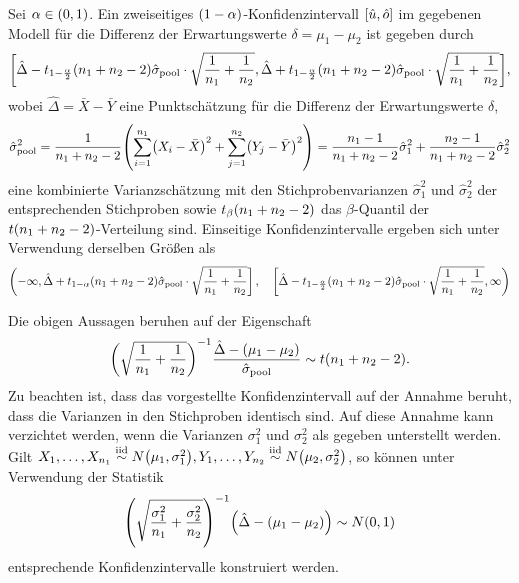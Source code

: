 \documentclass{lecture}
\begin{document}
    \begin{theorem}
        Sei \(\alpha \in \parentheses*{0, 1}\).
        Ein zweiseitiges \(\parentheses*{1 - \alpha}\)-Konfidenzintervall \(\brackets*{\hat{u}, \hat{o}}\) im gegebenen Modell für die Differenz der Erwartungswerte \(\delta = \mu_1 - \mu_2\) ist gegeben durch
        \[
            \brackets*{\hat{\Delta} - t_{1 - \frac{\alpha}{2}}\parentheses*{n_1 + n_2 - 2}\hat{\sigma}_{\text{pool}} \cdot \sqrt{\frac{1}{n_1} + \frac{1}{n_2}}, \hat{\Delta} + t_{1 - \frac{\alpha}{2}}\parentheses*{n_1 + n_2 - 2}\hat{\sigma}_{\text{pool}} \cdot \sqrt{\frac{1}{n_1} + \frac{1}{n_2}}},
        \]
        wobei \(\hat{\Delta} = \bar{X} - \bar{Y}\) eine Punktschätzung für die Differenz der Erwartungswerte \(\delta\),
        \[
            \hat{\sigma}_{\text{pool}}^2 = \frac{1}{n_1 + n_2 - 2}\parentheses*{\sum_{i = 1}^{n_1}\parentheses*{X_i - \bar{X}}^2 + \sum_{j = 1}^{n_2}\parentheses*{Y_j - \bar{Y}}^2} = \frac{n_1 - 1}{n_1 + n_2 - 2}\hat{\sigma}_1^2 + \frac{n_2 - 1}{n_1 + n_2 - 2}\hat{\sigma}_2^2
        \]
        eine kombinierte Varianzschätzung mit den Stichprobenvarianzen \(\hat{\sigma}_1^2\) und \(\hat{\sigma}_2^2\) der entsprechenden Stichproben sowie \(t_\beta\parentheses*{n_1 + n_2 - 2}\) das \(\beta\)-Quantil der \(t\parentheses*{n_1 + n_2 - 2}\)-Verteilung sind.
        Einseitige Konfidenzintervalle ergeben sich unter Verwendung derselben Größen als
        \[
            \left(-\infty, \hat{\Delta} + t_{1 - \alpha}\parentheses*{n_1 + n_2 - 2}\hat{\sigma}_{\text{pool}} \cdot \sqrt{\frac{1}{n_1} + \frac{1}{n_2}}\right], \quad \left[\hat{\Delta} - t_{1 - \frac{\alpha}{2}}\parentheses*{n_1 + n_2 - 2}\hat{\sigma}_{\text{pool}} \cdot \sqrt{\frac{1}{n_1} + \frac{1}{n_2}}, \infty\right)
        \]
    \end{theorem}

    Die obigen Aussagen beruhen auf der Eigenschaft
    \[
        \parentheses*{\sqrt{\frac{1}{n_1} + \frac{1}{n_2}}}^{-1}\frac{\hat{\Delta} - \parentheses*{\mu_1 - \mu_2}}{\hat{\sigma}_{\text{pool}}} \sim t\parentheses*{n_1 + n_2 - 2}.
    \]
    Zu beachten ist, dass das vorgestellte Konfidenzintervall auf der Annahme beruht, dass die Varianzen in den Stichproben identisch sind.
    Auf diese Annahme kann verzichtet werden, wenn die Varianzen \(\sigma_1^2\) und \(\sigma_2^2\) als gegeben unterstellt werden.
    Gilt \(X_1, \ldots, X_{n_1} \stackrel{\text{iid}}{\sim} N\parentheses*{\mu_1, \sigma_1^2}, Y_1, \ldots, Y_{n_2} \stackrel{\text{iid}}{\sim} N\parentheses*{\mu_2, \sigma_2^2}\), so können unter Verwendung der Statistik
    \[
        \parentheses*{\sqrt{\frac{\sigma_1^2}{n_1} + \frac{\sigma_2^2}{n_2}}}^{-1}\parentheses*{\hat{\Delta} - \parentheses*{\mu_1 - \mu_2}} \sim N\parentheses*{0, 1}
    \]
    entsprechende Konfidenzintervalle konstruiert werden.
\end{document}
